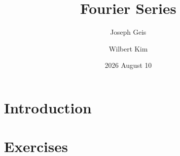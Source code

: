 \documentclass[11pt, oneside]{amsart}   	%
\title{Fourier Series}
\author{Joseph Geis}
\author{Wilbert Kim}
\date{2026 August 10}
\theoremstyle{definition}
\begin{document}
\maketitle

\section{Introduction}



\section{Exercises}














\end{document}

